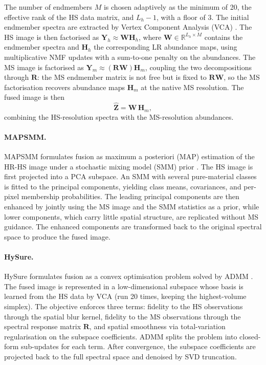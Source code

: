 The number of endmembers \(M\) is chosen adaptively as the minimum of 20, the effective rank of the HS data matrix, and \(L_h - 1\), with a floor of 3. The initial endmember spectra are extracted by Vertex Component Analysis (VCA) \cite{nascimento2005vca}. The HS image is then factorised as \(\mathbf{Y}_h \approx \mathbf{W}\mathbf{H}_h\), where \(\mathbf{W} \in \mathbb{R}^{L_h \times M}\) contains the endmember spectra and \(\mathbf{H}_h\) the corresponding LR abundance maps, using multiplicative NMF updates with a sum-to-one penalty on the abundances. The MS image is factorised as \(\mathbf{Y}_m \approx (\mathbf{R}\mathbf{W})\mathbf{H}_m\), coupling the two decompositions through \(\mathbf{R}\): the MS endmember matrix is not free but is fixed to \(\mathbf{R}\mathbf{W}\), so the MS factorisation recovers abundance maps \(\mathbf{H}_m\) at the native MS resolution. The fused image is then
\[
  \widehat{\mathbf{Z}} = \mathbf{W}\,\mathbf{H}_m,
\]
combining the HS-resolution spectra with the MS-resolution abundances.

\paragraph{MAPSMM.}
MAPSMM formulates fusion as maximum a posteriori (MAP) estimation of the HR-HS image under a stochastic mixing model (SMM) prior \cite{hardie2004map}. The HS image is first projected into a PCA subspace. An SMM with several pure-material classes is fitted to the principal components, yielding class means, covariances, and per-pixel membership probabilities. The leading principal components are then enhanced by jointly using the MS image and the SMM statistics as a prior, while lower components, which carry little spatial structure, are replicated without MS guidance. The enhanced components are transformed back to the original spectral space to produce the fused image.

\paragraph{HySure.}
HySure formulates fusion as a convex optimisation problem solved by ADMM \cite{simoes2015hysure}. The fused image is represented in a low-dimensional subspace whose basis is learned from the HS data by VCA (run 20 times, keeping the highest-volume simplex). The objective enforces three terms: fidelity to the HS observations through the spatial blur kernel, fidelity to the MS observations through the spectral response matrix \(\mathbf{R}\), and spatial smoothness via total-variation regularisation on the subspace coefficients. ADMM splits the problem into closed-form sub-updates for each term. After convergence, the subspace coefficients are projected back to the full spectral space and denoised by SVD truncation.

